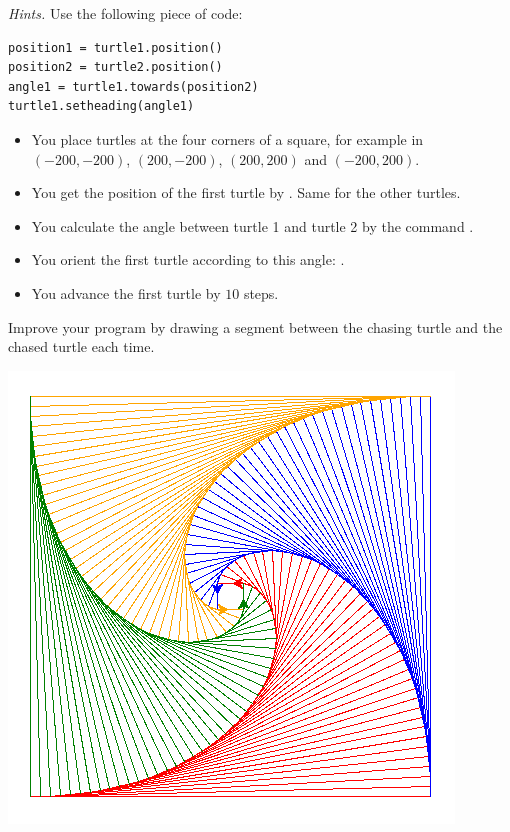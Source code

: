 \documentclass[11pt,class=report,crop=false]{standalone}
\begin{document}
\begin{activite}
\emph{Hints.}
Use the following piece of code:
\begin{center}
\begin{minipage}{0.5\textwidth}
\begin{lstlisting}
position1 = turtle1.position()
position2 = turtle2.position()
angle1 = turtle1.towards(position2)
turtle1.setheading(angle1)
\end{lstlisting}
\end{minipage}
\end{center}
\begin{itemize}
  \item You place turtles at the four corners of a square, for example in $(-200,-200)$,
  $(200,-200)$, $(200,200)$ and $(-200,200)$.
  \item You get the position of the first turtle by 
  .
  Same for the other turtles.
  \item You calculate the angle between turtle 1 and turtle 2 by the command
  .
  \item You orient the first turtle according to this angle:
  .
  \item You advance the first turtle by $10$ steps.
\end{itemize}

Improve your program by drawing a segment between the chasing turtle and the chased turtle each time.

\begin{center}
\includegraphics[scale=\myscale,scale=0.5]{screen-turtle-6b}
\end{center}  
\end{activite}
\end{document}

